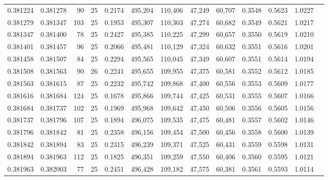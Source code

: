 \begin{tabular}{rrrrrrrrrrrrr}
0.381224 & 0.381278 &    90 &  25 &                                     0.2174 & 495,204 & 110,406 &  47,249 &  60,707 & 0.3548 & 0.5623 & 1.0227 \\
0.381279 & 0.381347 &   103 &  25 &                                     0.1953 & 495,307 & 110,303 &  47,274 &  60,682 & 0.3549 & 0.5621 & 1.0217 \\
0.381347 & 0.381400 &    78 &  25 &                                     0.2427 & 495,385 & 110,225 &  47,299 &  60,657 & 0.3550 & 0.5619 & 1.0210 \\
0.381401 & 0.381457 &    96 &  25 &                                     0.2066 & 495,481 & 110,129 &  47,324 &  60,632 & 0.3551 & 0.5616 & 1.0201 \\
0.381458 & 0.381507 &    84 &  25 &                                     0.2294 & 495,565 & 110,045 &  47,349 &  60,607 & 0.3551 & 0.5614 & 1.0194 \\
0.381508 & 0.381563 &    90 &  26 &                                     0.2241 & 495,655 & 109,955 &  47,375 &  60,581 & 0.3552 & 0.5612 & 1.0185 \\
0.381563 & 0.381615 &    87 &  25 &                                     0.2232 & 495,742 & 109,868 &  47,400 &  60,556 & 0.3553 & 0.5609 & 1.0177 \\
0.381616 & 0.381684 &   124 &  25 &                                     0.1678 & 495,866 & 109,744 &  47,425 &  60,531 & 0.3555 & 0.5607 & 1.0166 \\
0.381684 & 0.381737 &   102 &  25 &                                     0.1969 & 495,968 & 109,642 &  47,450 &  60,506 & 0.3556 & 0.5605 & 1.0156 \\
0.381737 & 0.381796 &   107 &  25 &                                     0.1894 & 496,075 & 109,535 &  47,475 &  60,481 & 0.3557 & 0.5602 & 1.0146 \\
0.381796 & 0.381842 &    81 &  25 &                                     0.2358 & 496,156 & 109,454 &  47,500 &  60,456 & 0.3558 & 0.5600 & 1.0139 \\
0.381842 & 0.381894 &    83 &  25 &                                     0.2315 & 496,239 & 109,371 &  47,525 &  60,431 & 0.3559 & 0.5598 & 1.0131 \\
0.381894 & 0.381963 &   112 &  25 &                                     0.1825 & 496,351 & 109,259 &  47,550 &  60,406 & 0.3560 & 0.5595 & 1.0121 \\
0.381963 & 0.382003 &    77 &  25 &                                     0.2451 & 496,428 & 109,182 &  47,575 &  60,381 & 0.3561 & 0.5593 & 1.0114 \\

\end{tabular}
